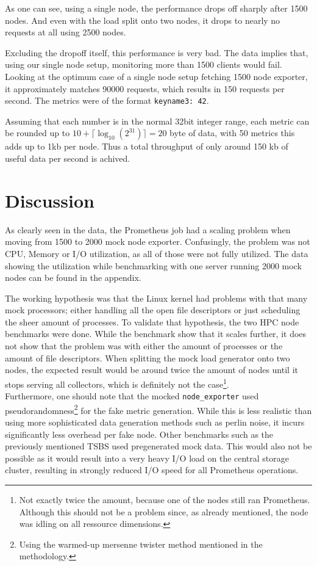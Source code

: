 As one can see, using a single node, the performance drops off sharply after 1500 nodes. And even with the load split onto two nodes, it drops to nearly no requests at all using 2500 nodes. 

Excluding the dropoff itself, this performance is very bad. The data implies that, using our single node setup, monitoring more than 1500 clients would fail. Looking at the optimum case of a single node setup fetching 1500 node exporter, it approximately matches 90000 requests, which results in 150 requests per second. The metrics were of the format \texttt{keyname3: 42}. 

Assuming that each number is in the normal 32bit integer range, each metric can be rounded up to $10+\lceil\log_{10}(2^{31})\rceil = 20$ byte of data, with 50 metrics this adds up to 1kb per node. Thus a total throughput of only around 150 kb of useful data per second is achived.


\section{Discussion}
As clearly seen in the data, the Prometheus job had a scaling problem when moving from 1500 to 2000 mock node exporter. Confusingly, the problem was not CPU, Memory or I/O utilization, as all of those were not fully utilized. The data showing the utilization while benchmarking with one server running 2000 mock nodes can be found in the appendix.

The working hypothesis was that the Linux kernel had problems with that many mock processors; either handling all the open file descriptors or just scheduling the sheer amount of processes. To validate that hypothesis, the two \ac{HPC} node benchmarks were done. While the benchmark show that it scales further, it does not show that the problem was with either the amount of processes or the amount of file descriptors. When splitting the mock load generator onto two nodes, the expected result would be around twice the amount of nodes until it stops serving all collectors, which is definitely not the case\footnote{Not exactly twice the amount, because one of the nodes still ran Prometheus. Although this should not be a problem since, as already mentioned, the node was idling on all ressource dimensions.}.\\

Furthermore, one should note that the mocked \texttt{node\_exporter} used pseudorandomness\footnote{Using the warmed-up mersenne twister method mentioned in the methodology.} for the fake metric generation. While this is less realistic than using more sophisticated data generation methods such as perlin noise, it incurs significantly less overhead per fake node. Other benchmarks such as the previously mentioned \ac{TSBS} used pregenerated mock data. This would also not be possible as it would result into a very heavy I/O load on the central storage cluster, resulting in strongly reduced I/O speed for all Prometheus operations.\\

